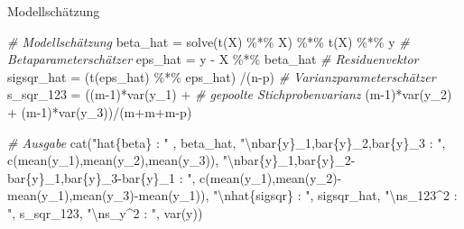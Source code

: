 \documentclass[
  8pt,
  ignorenonframetext,
]{beamer}
\newenvironment{Shaded}{\begin{snugshade}}{\end{snugshade}}
\newcommand{\CommentTok}[1]{\textcolor[rgb]{0.56,0.35,0.01}{\textit{#1}}}
\newcommand{\DecValTok}[1]{\textcolor[rgb]{0.00,0.00,0.81}{#1}}
\newcommand{\FunctionTok}[1]{\textcolor[rgb]{0.00,0.00,0.00}{#1}}
\newcommand{\NormalTok}[1]{#1}
\newcommand{\OtherTok}[1]{\textcolor[rgb]{0.56,0.35,0.01}{#1}}
\newcommand{\SpecialCharTok}[1]{\textcolor[rgb]{0.00,0.00,0.00}{#1}}
\newcommand{\StringTok}[1]{\textcolor[rgb]{0.31,0.60,0.02}{#1}}
\begin{document}
\begin{frame}[fragile]{Modellschätzung}
\begin{Shaded}
\begin{Highlighting}[]
\CommentTok{\# Modellschätzung}
\NormalTok{beta\_hat   }\OtherTok{=} \FunctionTok{solve}\NormalTok{(}\FunctionTok{t}\NormalTok{(X) }\SpecialCharTok{\%*\%}\NormalTok{ X) }\SpecialCharTok{\%*\%} \FunctionTok{t}\NormalTok{(X) }\SpecialCharTok{\%*\%}\NormalTok{ y                   }\CommentTok{\# Betaparameterschätzer}
\NormalTok{eps\_hat    }\OtherTok{=}\NormalTok{ y }\SpecialCharTok{{-}}\NormalTok{ X }\SpecialCharTok{\%*\%}\NormalTok{ beta\_hat                                 }\CommentTok{\# Residuenvektor}
\NormalTok{sigsqr\_hat }\OtherTok{=}\NormalTok{ (}\FunctionTok{t}\NormalTok{(eps\_hat) }\SpecialCharTok{\%*\%}\NormalTok{ eps\_hat) }\SpecialCharTok{/}\NormalTok{(n}\SpecialCharTok{{-}}\NormalTok{p)                    }\CommentTok{\# Varianzparameterschätzer}
\NormalTok{s\_sqr\_123 }\OtherTok{=}\NormalTok{ ((m}\DecValTok{{-}1}\NormalTok{)}\SpecialCharTok{*}\FunctionTok{var}\NormalTok{(y\_1) }\SpecialCharTok{+}                                   \CommentTok{\# gepoolte Stichprobenvarianz}
\NormalTok{             (m}\DecValTok{{-}1}\NormalTok{)}\SpecialCharTok{*}\FunctionTok{var}\NormalTok{(y\_2) }\SpecialCharTok{+}
\NormalTok{             (m}\DecValTok{{-}1}\NormalTok{)}\SpecialCharTok{*}\FunctionTok{var}\NormalTok{(y\_3))}\SpecialCharTok{/}\NormalTok{(m}\SpecialCharTok{+}\NormalTok{m}\SpecialCharTok{+}\NormalTok{m}\SpecialCharTok{{-}}\NormalTok{p)}

\CommentTok{\# Ausgabe}
\FunctionTok{cat}\NormalTok{(}\StringTok{"hat\{beta\}                                    : "}\NormalTok{  , beta\_hat,}
    \StringTok{"}\SpecialCharTok{\textbackslash{}n}\StringTok{bar\{y\}\_1,bar\{y\}\_2,bar\{y\}\_3                   : "}\NormalTok{, }\FunctionTok{c}\NormalTok{(}\FunctionTok{mean}\NormalTok{(y\_1),}\FunctionTok{mean}\NormalTok{(y\_2),}\FunctionTok{mean}\NormalTok{(y\_3)),}
    \StringTok{"}\SpecialCharTok{\textbackslash{}n}\StringTok{bar\{y\}\_1,bar\{y\}\_2{-}bar\{y\}\_1,bar\{y\}\_3{-}bar\{y\}\_1 : "}\NormalTok{, }\FunctionTok{c}\NormalTok{(}\FunctionTok{mean}\NormalTok{(y\_1),}\FunctionTok{mean}\NormalTok{(y\_2)}\SpecialCharTok{{-}}\FunctionTok{mean}\NormalTok{(y\_1),}\FunctionTok{mean}\NormalTok{(y\_3)}\SpecialCharTok{{-}}\FunctionTok{mean}\NormalTok{(y\_1)),}
    \StringTok{"}\SpecialCharTok{\textbackslash{}n}\StringTok{hat\{sigsqr\}                                  : "}\NormalTok{, sigsqr\_hat,}
    \StringTok{"}\SpecialCharTok{\textbackslash{}n}\StringTok{s\_123\^{}2                                      : "}\NormalTok{, s\_sqr\_123,}
    \StringTok{"}\SpecialCharTok{\textbackslash{}n}\StringTok{s\_y\^{}2                                        : "}\NormalTok{, }\FunctionTok{var}\NormalTok{(y))}
\end{Highlighting}
\end{Shaded}


\end{frame}
\end{document}
